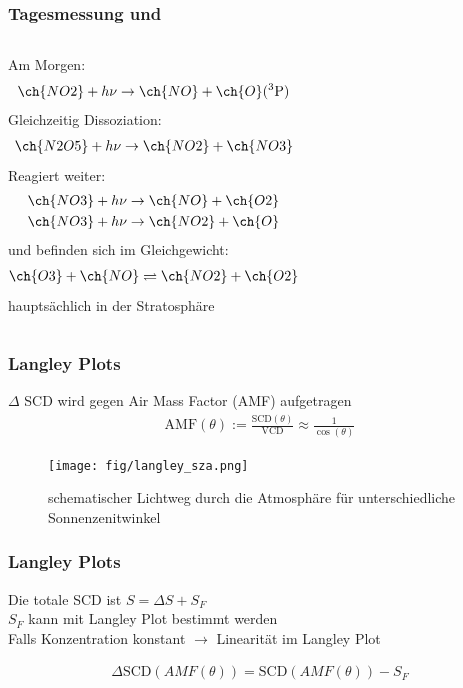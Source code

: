 \documentclass{beamer}
\begin{document}
\begin{frame}
    \frametitle{Tagesmessung  und }
    \begin{columns}
    	Am Morgen:
    	\begin{align}
    		\ch{NO2} + h \nu \to \ch{NO} + \ch{O}(^3\text{P})
    	\end{align}
    \pause
    	Gleichzeitig Dissoziation:
    	\begin{align}
    		\ch{N2O5} + h \nu \to \ch{NO2} + \ch{NO3}
    	\end{align}
    \pause
    	Reagiert weiter:
    	\begin{align}
    		\ch{NO3} + h \nu \to \ch{NO} + \ch{O2}\\
    		\ch{NO3} + h \nu \to \ch{NO2} + \ch{O}
    	\end{align}
    \pause	
      	 und  befinden sich im Gleichgewicht:
      		\begin{align}
      			\ch{O3} + \ch{NO} \rightleftharpoons \ch{NO2} + \ch{O2}
      		\end{align}
      	 hauptsächlich in der Stratosphäre	
    \end{columns}
\end{frame}

\begin{frame}
    \frametitle{Langley Plots}
    $\Delta$ SCD wird gegen Air Mass Factor (AMF) aufgetragen\\
    
    \begin{align}
        \text{AMF}(\theta) := \frac{\text{SCD}(\theta)}{\text{VCD}} \approx \frac{1}{\cos (\theta)}
    \end{align}
    
    \begin{figure}
        \texttt{[image: fig/langley\_sza.png]}
        \caption{schematischer Lichtweg durch die Atmosphäre für unterschiedliche Sonnenzenitwinkel \cite{atm_script}}
    \end{figure}
\end{frame}

\begin{frame}
    \frametitle{Langley Plots}
    Die totale SCD ist $S = \Delta S + S_F$\\
    $S_F$ kann mit Langley Plot bestimmt werden\\
    Falls Konzentration konstant $\to$ Linearität im Langley Plot
    
    \begin{align}
    	\Delta \text{SCD}(AMF(\theta)) = \text{SCD}(AMF(\theta)) - S_F
    \end{align}
\end{frame}
\end{document}
